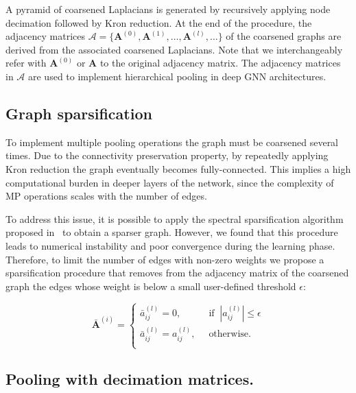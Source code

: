\documentclass[journal]{IEEEtran}
\def\A{{\mathbf A}}
\begin{document}
A pyramid of coarsened Laplacians is generated by recursively applying node decimation followed by Kron reduction. 
At the end of the procedure, the adjacency matrices $\mathcal{A} = \{\A^{(0)}, \A^{(1)}, \dots, \A^{(l)}, \dots\}$ of the coarsened graphs are derived from the associated coarsened Laplacians.
Note that we interchangeably refer with $\A^{(0)}$ or $\A$ to the original adjacency matrix.
The adjacency matrices in $\mathcal{A}$ are used to implement hierarchical pooling in deep GNN architectures.



\subsection{Graph sparsification}
\label{sec:sparsify}

To implement multiple pooling operations the graph must be coarsened several times.
Due to the connectivity preservation property, by repeatedly applying Kron reduction the graph eventually becomes fully-connected.
This implies a high computational burden in deeper layers of the network, since the complexity of MP operations scales with the number of edges.

To address this issue, it is possible to apply the spectral sparsification algorithm proposed in~\cite{batson2013spectral} to obtain a sparser graph. However, we found that this procedure leads to numerical instability and poor convergence during the learning phase.
Therefore, to limit the number of edges with non-zero weights we propose a sparsification procedure that removes from the adjacency matrix of the coarsened graph the edges whose weight is below a small user-defined threshold $\epsilon$:

\begin{equation}
    \bar \A^{(i)} = 
    \begin{cases}
    \bar a^{(l)}_{ij} = 0,              & \;\; \text{if} \;\; |a^{(l)}_{ij}| \leq \epsilon \\
    \bar a^{(l)}_{ij} = a^{(l)}_{ij},   &\;\; \text{otherwise}.\\
    \end{cases}
\end{equation}


\subsection{Pooling with decimation matrices.}
\label{sec:pooling_matrices}
\end{document}
